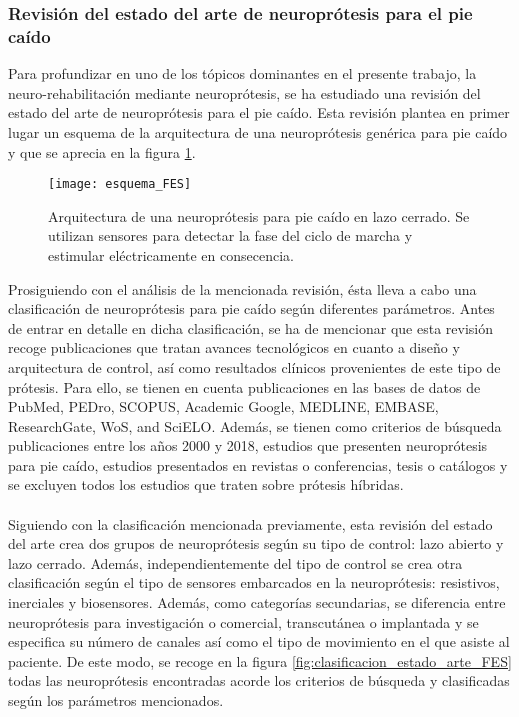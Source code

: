 \subsubsection{Revisión del estado del arte de neuroprótesis para el pie caído}
Para profundizar en uno de los tópicos dominantes en el presente trabajo, la neuro-rehabilitación mediante neuroprótesis, se ha estudiado una revisión del estado del arte de neuroprótesis para el pie caído\cite{estado_arte_FES}. Esta revisión plantea en primer lugar un esquema de la arquitectura de una neuroprótesis genérica para pie caído y que se aprecia en la figura \ref{fig:esquema_FES}.\\
 
\begin{figure}[!htb]
\centering
\texttt{[image: esquema\_FES]}
  \caption{Arquitectura de una neuroprótesis para pie caído en lazo cerrado. Se utilizan sensores para detectar la fase del ciclo de marcha y estimular eléctricamente en consecencia\cite{estado_arte_FES}.}\label{fig:esquema_FES}
\end{figure}

Prosiguiendo con el análisis de la mencionada revisión, ésta lleva a cabo una clasificación de neuroprótesis para pie caído según diferentes parámetros. Antes de entrar en detalle en dicha clasificación, se ha de mencionar que esta revisión recoge publicaciones que tratan avances tecnológicos en cuanto a diseño y arquitectura de control, así como resultados clínicos provenientes de este tipo de prótesis. Para ello, se tienen en cuenta publicaciones en las bases de datos de PubMed, PEDro, SCOPUS, Academic Google, MEDLINE, EMBASE, ResearchGate, WoS, and SciELO. Además, se tienen como criterios de búsqueda publicaciones entre los años 2000 y 2018, estudios que presenten neuroprótesis para pie caído, estudios presentados en revistas o conferencias, tesis o catálogos y se excluyen todos los estudios que traten sobre prótesis híbridas.
\\
\\
Siguiendo con la clasificación mencionada previamente, esta revisión del estado del arte crea dos grupos de neuroprótesis según su tipo de control: lazo abierto y lazo cerrado. Además, independientemente del tipo de control se crea otra clasificación según el tipo de sensores embarcados en la neuroprótesis: resistivos, inerciales y biosensores. Además, como categorías secundarias, se diferencia entre neuroprótesis para investigación o comercial, transcutánea o implantada y se especifica su número de canales así como el tipo de movimiento en el que asiste al paciente. De este modo, se recoge en la figura \ref{fig:clasificacion_estado_arte_FES} todas las neuroprótesis encontradas acorde los criterios de búsqueda y clasificadas según los parámetros mencionados.\\


